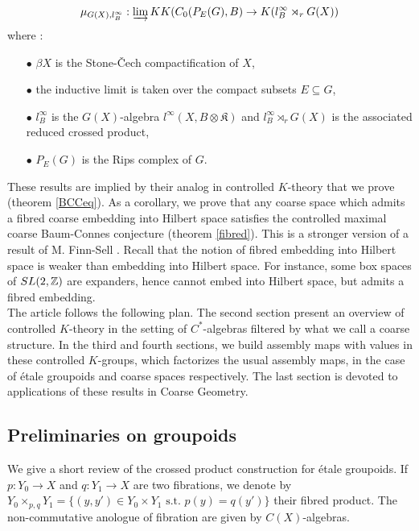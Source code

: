 \[\mu_{G(X),l^\infty_B} : \varinjlim KK(C_0(P_E(G),B) \rightarrow K(l^\infty_B\rtimes_r G(X))\]
where :
\begin{itemize}
\item[$\bullet$] $\beta X$ is the Stone-\v{C}ech compactification of $X$,
\item[$\bullet$] the inductive limit is taken over the compact subsets $E\subseteq G$,
\item[$\bullet$] $l^\infty_B$ is the $G(X)$-algebra $l^\infty (X,B\otimes \mathfrak K)$ and $l^\infty_B\rtimes_r G(X)$ is the associated reduced crossed product,
\item[$\bullet$] $P_E(G)$ is the Rips complex of $G$.
\end{itemize}
These results are implied by their analog in controlled $K$-theory that we prove (theorem \ref{BCCeq}). As a corollary, we prove that any coarse space which admits a fibred coarse embedding into Hilbert space satisfies the controlled maximal coarse Baum-Connes conjecture (theorem \ref{fibred}). This is a stronger version of a result of M. Finn-Sell \cite{FinnSellFibred}. Recall that the notion of fibred embedding into Hilbert space is weaker than embedding into Hilbert space. For instance, some box spaces of $SL(2,\mathbb Z)$ are expanders, hence cannot embed into Hilbert space, but admits a fibred embedding.\\ 

The article follows the following plan. The second section present an overview of controlled $K$-theory in the setting of $C^*$-algebras filtered by what we call a coarse structure. In the third and fourth sections, we build assembly maps with values in these controlled $K$-groups, which factorizes the usual assembly maps, in the case of étale groupoids and coarse spaces respectively. The last section is devoted to applications of these results in Coarse Geometry.

\subsection{Preliminaries on groupoids}

We give a short review of the crossed product construction for étale groupoids. If $p : Y_0\rightarrow X$ and $q : Y_1\rightarrow X$ are two fibrations, we denote by $Y_0\times_{p,q} Y_1 = \{(y,y')\in Y_0\times Y_1 \text{ s.t. } p(y)=q(y')\}$ their fibred product. The non-commutative anologue of fibration are given by $C(X)$-algebras. 

